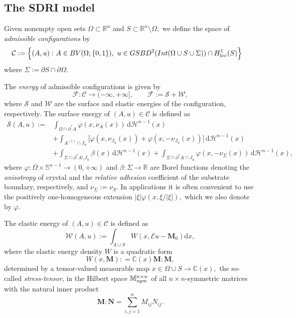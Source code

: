 \documentclass[reqno]{amsart}
\numberwithin{equation}{section}
\theoremstyle{plain}
\theoremstyle{definition}
\newcommand{\C}{\mathbb{C}}
\newcommand{\R}{\mathbb{R}}
\renewcommand{\S}{\mathbb{S}}
\newcommand{\bN}{\mathbf{N}}
\newcommand{\bM}{\mathbf{M}}
\newcommand{\cH}{\mathcal{H}}
\newcommand{\cS}{\mathcal{S}}
\newcommand{\cF}{\mathcal{F}}
\newcommand{\cW}{\mathcal{W}}
\newcommand{\p}{\partial}
\renewcommand{\d}{\mathrm{d}}
\newcommand{\loc}{\mathrm{loc}}
\newcommand{\str}[1]{\mathcal{E}#1}
\newcommand{\mtwo}{\mathbb{M}^{n\times n}_{\rm sym}}
\newcommand{\admissible}{\mathcal{C}}
\newcommand{\substrate}{S}
\newcommand{\Ins}[1]{{\rm Int}{(#1\cup \substrate\cup \Sigma)}}
\begin{document}
 
\subsection{The SDRI model} 



Given nonempty open sets $\Omega \subset\R^n$ and $\substrate\subset\R^n\setminus\Omega,$ we define  
the space of {\it admissible  configurations} by 
$$
\begin{aligned}
\admissible:=\Big\{(A,u):\,\,& A\in BV(\Omega;\{0,1\}),\,\,u\in GSBD^2(\Ins{\Omega})\cap H_\loc^1(\substrate) \Big\} 
\end{aligned}
$$
where $\Sigma:=\p \substrate\cap \p \Omega.$


The {\it energy} of admissible configurations is given by
%
\begin{equation*} 
\cF:\admissible\to (-\infty,+\infty], \qquad \cF:=\cS + \cW,
\end{equation*}
%
where $\cS$ and $\cW$ are the surface and elastic energies of the configuration, respectively. The surface energy of $(A,u)\in\admissible$ is defined as 
%
\begin{align*}
\cS(A,u):=& \int_{\Omega \cap\p^*A} \varphi(x,\nu_A(x))\,\d \cH^{n-1}(x) \nonumber \\
&+\int_{A^{(1)}\cap J_u} \big[\varphi(x,\nu_{J_u}(x)) + \varphi(x,-\nu_{J_u}(x))\big]\,\d\cH^{n-1}(x)\nonumber\\  
& + \int_{\Sigma\cap \p^*A\setminus J_u} \beta(x) \,\d\cH^{n-1}(x)  + \int_{\Sigma\cap \p^*A\cap J_u} \varphi(x,-\nu_\Sigma(x))\,\d\cH^{n-1}(x), 
\end{align*}
%
where
$\varphi:\overline\Omega\times\S^{n-1}\to(0,+\infty)$ and $\beta:\Sigma\to\R$  are  Borel functions  denoting the {\it anisotropy} of crystal and the {\it relative adhesion} coefficient of the substrate boundary, respectively, and  $\nu_\Sigma:=\nu_\substrate.$
In applications  it is often convenient to use  the positively one-homogeneous extension $|\xi|\varphi(x,\xi/|\xi|),$ which we also denote by $\varphi.$

The elastic energy of $(A,u)\in\admissible$ is defined as
$$
{\mathcal W}(A,u):= \int_{A\cup  \substrate } W(x,\str{u}  - \bM_0) \d x,
$$
where the elastic energy density $W$ is a quadratic form 
$$
W(x,\bM): =  \C(x)\bM:\bM,
$$
determined by a tensor-valued measurable map $x\in\Omega\cup\substrate\to\C(x),$ the so-called {\it stress-tensor}, in the Hilbert space  $\mtwo$ of all $n\times n$-symmetric matrices with the natural inner product 
$$
\bM:\bN=\sum\limits_{i,j=1}^n M_{ij}N_{ij}.
$$
\end{document}
